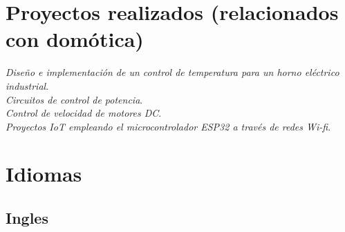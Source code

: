 \documentclass[11pt]{article} %
\begin{document}
\section*{Proyectos realizados (relacionados con dom\'otica)}

\emph{Diseño e implementaci\'on de un control de temperatura para un horno eléctrico industrial}. \\
\emph{Circuitos de control de potencia}. \\
\emph{Control de velocidad de motores DC}. \\
\emph{Proyectos IoT empleando el microcontrolador ESP32 a través de redes Wi-fi}. \\

\section*{Idiomas}

\subsection*{Ingles}
\end{document}
